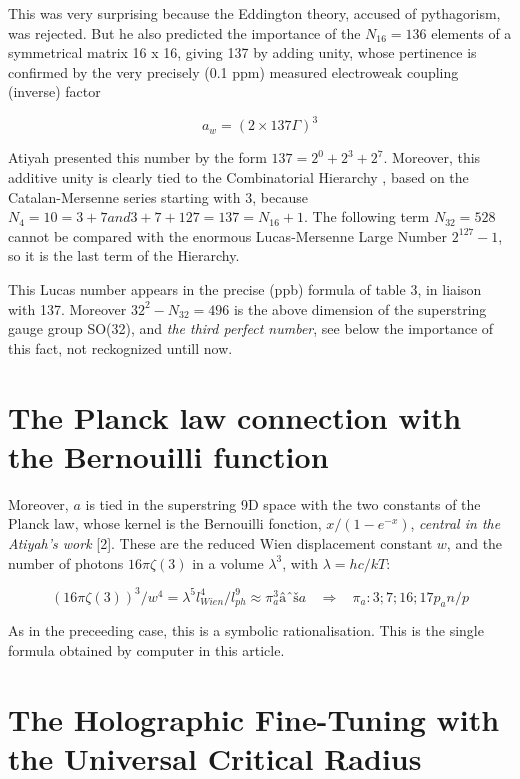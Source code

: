 \documentclass[a4paper,9pt]{article}
\begin{document}
 This was very surprising because the Eddington theory, accused of pythagorism, was rejected. But he also predicted the importance of the $N_16 = 136$ elements of a symmetrical matrix 16 x 16, giving 137 by adding unity, whose pertinence is confirmed by the very precisely (0.1 ppm) measured electroweak coupling (inverse) factor 

\begin{equation}
a_w = (2\times137 \Gamma)^3
\end{equation}
 
Atiyah presented this number by the form $137 = 2^0 + 2^3 + 2^7$. Moreover, this additive unity is clearly tied to the Combinatorial Hierarchy \cite{Bastin}, based on the Catalan-Mersenne series starting with 3, because $N_4 = 10 = 3 + 7 and 3+7 + 127 = 137 = N_16 + 1$. The following term $N_32  = 528$ cannot be compared with the enormous Lucas-Mersenne Large Number $2^{127}- 1$, so it is the last term of the Hierarchy. 

This Lucas number appears in the precise (ppb) formula of table 3, in liaison with 137. Moreover $32^2 - N_32 =  496$ is the above dimension of the superstring gauge group SO(32), and \textit {the third perfect number}, see below the importance of this fact, not reckognized untill now.




\section{The Planck law connection with the Bernouilli function}

 Moreover, $a$ is tied in the superstring 9D space with the two constants of the Planck law, whose kernel is the Bernouilli fonction, $x/(1-e^{-x})$, \textit {central in the Atiyah's work} [2]. These are the reduced Wien displacement constant $w$, and the number of photons $16\pi \zeta(3)$ in a volume $\lambda^3$, with $\lambda = hc/kT $:

\begin{equation}
(16\pi\zeta(3))^3/w^4 = \lambda^5l_{Wien}^4/l_{ph}^9 \approx \pi_a^3âˆša    ~~~~    \Rightarrow  ~~~~     \pi_a: 3;7;16;17p_an/p
\end{equation}

As in the preceeding case, this is a symbolic rationalisation. This is the single formula obtained by computer in this article.


\section{The Holographic Fine-Tuning with the Universal Critical Radius}
\end{document}

